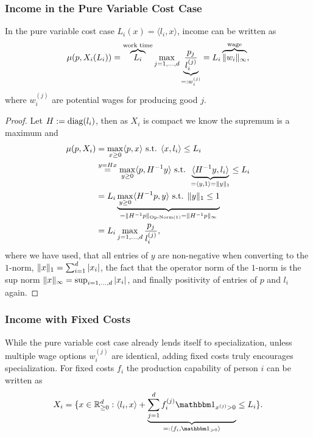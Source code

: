 \subsubsection{Income in the Pure Variable Cost Case}

\begin{lemma}
	In the pure variable cost case \(L_i(x) = \langle l_i, x\rangle\), income
	can be written as
	\[
		\mu(p, X_i(L_i))
		= \overbrace{L_i}^{\text{work time}} \max_{j=1,\dots,d}
		\underbrace{\frac{p_j}{l_i^{(j)}}}_{=: w_i^{(j)}}
		= L_i \overbrace{\|w_i\|_\infty}^{\text{wage}},
	\]
	where \(w_i^{(j)}\) are potential wages for producing good \(j\).
\end{lemma}
\begin{proof}
	Let \(H:= \operatorname{diag}(l_i)\), then as \(X_i\) is compact we know the supremum is
	a maximum and
	\begin{align*}
		\mu(p, X_i)
		&= \max_{x\ge 0} \langle p, x\rangle
		\text{ s.t. } \langle x, l_i\rangle \le L_i\\
		&\overset{y=Hx}= \max_{y\ge 0} \langle p, H^{-1}y\rangle
		\text{ s.t. } \underbrace{\langle H^{-1}y, l_i\rangle}_{
			= \langle y, 1 \rangle = \|y\|_1
		} \le L_i\\
		&= L_i \underbrace{
			\max_{y\ge 0} \langle H^{-1}p, y\rangle \text{ s.t. } \|y\|_1 \le 1
		}_{
			= \|H^{-1} p\|_{\text{Op-Norm(1)}} = \|H^{-1} p \|_\infty
		}\\
		&= L_i \max_{j=1,\dots,d} \frac{p_j}{l_i^{(j)}},
	\end{align*}
	where we have used, that all entries of \(y\) are non-negative when
	converting to the \(1\)-norm, \(\|x\|_1 = \sum_{i=1}^d |x_i|\), the
	fact that the operator norm of the \(1\)-norm is the sup norm
	\(\|x\|_\infty = \sup_{i=1,\dots,d} |x_i|\),
	and finally positivity of entries of \(p\) and \(l_i\) again.
\end{proof}

\subsubsection{Income with Fixed Costs}

While the pure variable cost case already lends itself to specialization, unless
multiple wage options \(w_i^{(j)}\) are identical, adding fixed costs truly
encourages specialization. For fixed costs \(f_i\) the production capability
of person \(i\) can be written as 
\[
	X_i = \{
		x\in \real_{\ge 0}^\dims
		: \langle l_i, x\rangle
		+ \underbrace{
			\sum_{j=1}^\dims f_i^{(j)}\ind_{x^{(j)}>0}
		}_{=: \langle f_i, \ind_{>0}\rangle} \le L_i
	\}.
\]

